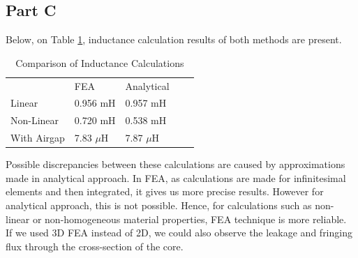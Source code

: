 \subsection*{Part C}

Below, on Table \ref{compare}, inductance calculation results of both methods are present.

\begin{table}
\centering
\caption{Comparison of Inductance Calculations}
\label{compare}
\begin{tabular}{lllll}
            & FEA         & Analytical  &  &  \\
Linear      & 0.956 mH    & 0.957 mH    &  &  \\
Non-Linear  & 0.720 mH    & 0.538 mH    &  &  \\
With Airgap & 7.83 $\mu$H & 7.87 $\mu$H &  & 
\end{tabular}
\end{table}

Possible discrepancies between these calculations are caused by approximations made in analytical approach. In FEA, as calculations are made for infinitesimal elements and then integrated, it gives us more precise results. However for analytical approach, this is not possible. Hence, for calculations such as non-linear or non-homogeneous material properties, FEA technique is more reliable.\\

If we used 3D FEA instead of 2D, we could also observe the leakage and fringing flux through the cross-section of the core.

